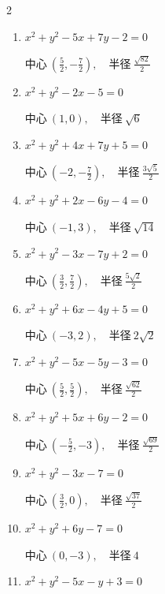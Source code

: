 \begin{multicols}{2}
\begin{enumerate}
        $\displaystyle 中心\: \left(0,-\frac{5}{2}\right), \quad 半径 \ \frac{\sqrt{41}}{2}$

  \item $x^{2}+y^{2}-5x+7y-2=0$

        $\displaystyle 中心\: \left(\frac{5}{2},-\frac{7}{2}\right), \quad 半径 \ \frac{\sqrt{82}}{2}$

  \item $x^{2}+y^{2}-2x-5=0$

        $\displaystyle 中心\: \left(1,0\right), \quad 半径 \ \sqrt{6}$

  \item $x^{2}+y^{2}+4x+7y+5=0$

        $\displaystyle 中心\: \left(-2,-\frac{7}{2}\right), \quad 半径 \ \frac{3\sqrt{5}}{2}$

  \item $x^{2}+y^{2}+2x-6y-4=0$

        $\displaystyle 中心\: \left(-1,3\right), \quad 半径 \ \sqrt{14}$

  \item $x^{2}+y^{2}-3x-7y+2=0$

        $\displaystyle 中心\: \left(\frac{3}{2},\frac{7}{2}\right), \quad 半径 \ \frac{5\sqrt{2}}{2}$

  \item $x^{2}+y^{2}+6x-4y+5=0$

        $\displaystyle 中心\: \left(-3,2\right), \quad 半径 \ 2\sqrt{2}$

  \item $x^{2}+y^{2}-5x-5y-3=0$

        $\displaystyle 中心\: \left(\frac{5}{2},\frac{5}{2}\right), \quad 半径 \ \frac{\sqrt{62}}{2}$

  \item $x^{2}+y^{2}+5x+6y-2=0$

        $\displaystyle 中心\: \left(-\frac{5}{2},-3\right), \quad 半径 \ \frac{\sqrt{69}}{2}$

  \item $x^{2}+y^{2}-3x-7=0$

        $\displaystyle 中心\: \left(\frac{3}{2},0\right), \quad 半径 \ \frac{\sqrt{37}}{2}$

  \item $x^{2}+y^{2}+6y-7=0$

        $\displaystyle 中心\: \left(0,-3\right), \quad 半径 \ 4$

  \item $x^{2}+y^{2}-5x-y+3=0$


\end{enumerate}
\end{multicols}
